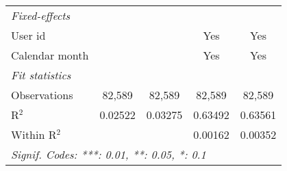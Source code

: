 \begin{table}[htbp]
\begin{scriptsize}
\begin{tabular}{lcccc}
         \midrule \emph{Fixed-effects} &   &   &   &  \\
         User id                     &                         &                         & Yes            & Yes\\
         Calendar month              &                         &                         & Yes            & Yes\\
         \midrule \emph{Fit statistics} &   &   &   &  \\
         Observations                & 82,589                  & 82,589                  & 82,589         & 82,589\\
         R$^2$                       & 0.02522                 & 0.03275                 & 0.63492        & 0.63561\\
         Within R$^2$                &                         &                         & 0.00162        & 0.00352\\
         \midrule\midrule\multicolumn{5}{l}{\emph{Signif. Codes: ***: 0.01, **: 0.05, *: 0.1}}\\
      \end{tabular}
   \end{scriptsize}
\end{table}


